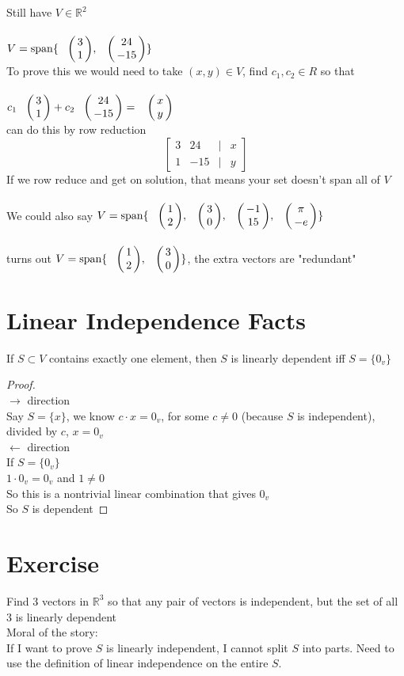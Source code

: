 \documentclass[11pt]{article}
\DeclareMathOperator{\Span}{span}
\begin{document}
Still have $V\in\mathbb{R}^2$\\
$V=\Span\{\bordermatrix{~ & \cr &3\cr &1},\bordermatrix{~ & \cr &24\cr &-15}\}$ \\
To prove this we would need to take $(x,y)\in V$, find $c_1,c_2\in R$ so that $c_1\bordermatrix{~ & \cr &3\cr &1}+c_2\bordermatrix{~ & \cr &24\cr &-15}=\bordermatrix{~ & \cr &x\cr &y}$\\
can do this by row reduction\\
\[
\begin{bmatrix}
3 & 24 & | & x\\
1 & -15 & | & y
\end{bmatrix}
\]
If we row reduce and get on solution, that means your set doesn't span all of $V$\\

We could also say $V=\Span\{\bordermatrix{~ & \cr &1\cr &2},\bordermatrix{~ & \cr &3\cr &0},\bordermatrix{~ & \cr &-1\cr &15},\bordermatrix{~ & \cr &\pi\cr &-e}\}$\\
turns out $V=\Span\{\bordermatrix{~ & \cr &1\cr &2},\bordermatrix{~ & \cr &3\cr &0}\}$, the extra vectors are "redundant"\\

\section*{Linear Independence Facts}
If $S\subset V$ contains exactly one element, then $S$ is linearly dependent iff $S=\{0_v\}$\\
\begin{proof}
\hfill\\
	$\rightarrow$ direction\\
	Say $S=\{x\}$, we know $c\cdot x=0_v$, for some $c\neq 0$ (because $S$ is independent), divided by $c$, $x=0_v$\\
	$\leftarrow$ direction\\
	If $S=\{0_v\}$\\
	$1\cdot 0_v=0_v$ and $1\neq 0$\\
	So this is a nontrivial linear combination that gives $0_v$\\
	So $S$ is dependent
\end{proof}

\section*{Exercise} 
Find 3 vectors in $\mathbb{R}^3$ so that any pair of vectors is independent, but the set of all 3 is linearly dependent\\
Moral of the story:\\
If I want to prove $S$ is linearly independent, I cannot split $S$ into parts. Need to use the definition of linear independence on the entire $S$.\\
\end{document}
